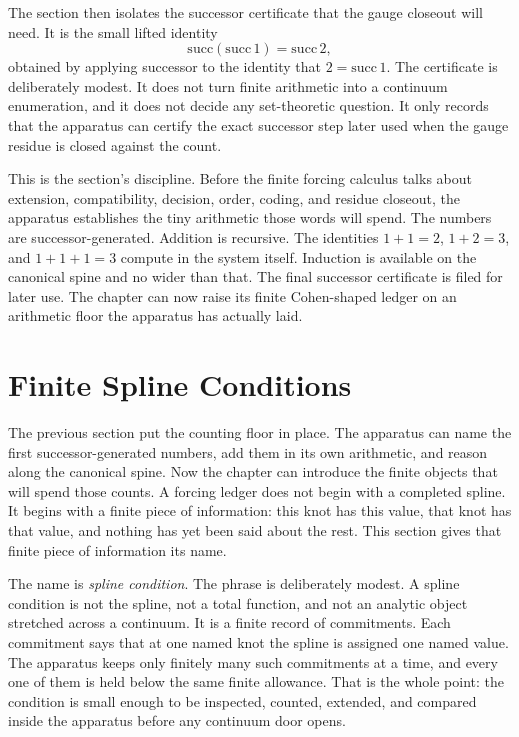 The section then isolates the successor certificate that the gauge closeout will
need. It is the small lifted identity
\[
  \mathrm{succ}(\mathrm{succ}\,1) = \mathrm{succ}\,2,
\]
obtained by applying successor to the identity that \(2=\mathrm{succ}\,1\). The
certificate is deliberately modest. It does not turn finite arithmetic into a
continuum enumeration, and it does not decide any set-theoretic question. It
only records that the apparatus can certify the exact successor step later used
when the gauge residue is closed against the count.

This is the section's discipline. Before the finite forcing calculus talks
about extension, compatibility, decision, order, coding, and residue closeout,
the apparatus establishes the tiny arithmetic those words will spend. The
numbers are successor-generated. Addition is recursive. The identities
\(1+1=2\), \(1+2=3\), and \(1+1+1=3\) compute in the system itself. Induction is
available on the canonical spine and no wider than that. The final successor
certificate is filed for later use. The chapter can now raise its finite
Cohen-shaped ledger on an arithmetic floor the apparatus has actually laid.

\section{Finite Spline Conditions}

The previous section put the counting floor in place. The apparatus can name
the first successor-generated numbers, add them in its own arithmetic, and
reason along the canonical spine. Now the chapter can introduce the finite
objects that will spend those counts. A forcing ledger does not begin with a
completed spline. It begins with a finite piece of information: this knot has
this value, that knot has that value, and nothing has yet been said about the
rest. This section gives that finite piece of information its name.

The name is \emph{spline condition}. The phrase is deliberately modest. A
spline condition is not the spline, not a total function, and not an analytic
object stretched across a continuum. It is a finite record of commitments. Each
commitment says that at one named knot the spline is assigned one named value.
The apparatus keeps only finitely many such commitments at a time, and every
one of them is held below the same finite allowance. That is the whole point:
the condition is small enough to be inspected, counted, extended, and compared
inside the apparatus before any continuum door opens.

